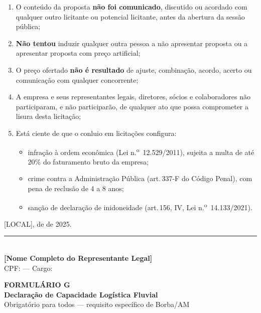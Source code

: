 \documentclass[12pt,a4paper]{article}
\newcommand{\formulario}[3]{%
  \clearpage
  \begin{tcolorbox}[enhanced,colback=navy,colframe=navy,arc=6pt,
    left=14pt,right=14pt,top=10pt,bottom=10pt]
    \color{white}
    {\large\bfseries FORMULÁRIO #1}\\[4pt]
    {\Large\bfseries #2}\\[4pt]
    {\small\color{ltblue} #3}
  \end{tcolorbox}
  \vspace{0.3cm}}
\newcommand{\art}[1]{art.\,#1}
\newcommand{\blank}[1]{\underline{\hspace{#1}}}
\newcommand{\exercicio}{2025}
\begin{document}
\begin{enumerate}
  \item O conteúdo da proposta \textbf{não foi comunicado}, discutido ou
    acordado com qualquer outro licitante ou potencial licitante, antes da
    abertura da sessão pública;

  \item \textbf{Não tentou} induzir qualquer outra pessoa a não apresentar
    proposta ou a apresentar proposta com preço artificial;

  \item O preço ofertado \textbf{não é resultado} de ajuste, combinação,
    acordo, acerto ou comunicação com qualquer concorrente;

  \item A empresa e seus representantes legais, diretores, sócios e
    colaboradores não participaram, e não participarão, de qualquer ato
    que possa comprometer a lisura desta licitação;

  \item Está ciente de que o conluio em licitações configura:
    \begin{itemize}
      \item infração à ordem econômica (Lei n.\textsuperscript{o}~12.529/2011),
        sujeita a multa de até 20\% do faturamento bruto da empresa;
      \item crime contra a Administração Pública (\art{337-F} do Código Penal),
        com pena de reclusão de 4 a 8 anos;
      \item sanção de declaração de inidoneidade (\art{156}, IV,
        Lei n.\textsuperscript{o}~14.133/2021).
    \end{itemize}
\end{enumerate}

\vspace{1.2cm}
\begin{center}
  [LOCAL], \blank{0.8cm} de \blank{3cm} de \exercicio.\\[1.0cm]
  \rule{9cm}{0.5pt}\\[3pt]
  \textbf{[Nome Completo do Representante Legal]}\\
  \small CPF: \blank{3cm} --- Cargo: \blank{3cm}
\end{center}

\formulario{G}{Declaração de Capacidade Logística Fluvial}{%
  Obrigatório para todos --- requisito específico de Borba/AM}
\end{document}
